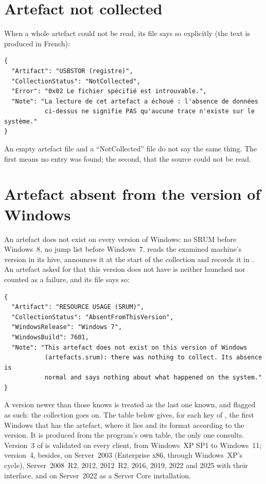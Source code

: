 \documentclass[11pt,a4paper,oneside]{report}
\begin{document}
\section{Artefact not collected}

When a whole artefact could not be read, its file says so explicitly (the text
is produced in French):

\begin{lstlisting}
{
  "Artifact": "USBSTOR (registre)",
  "CollectionStatus": "NotCollected",
  "Error": "0x02 Le fichier spécifié est introuvable.",
  "Note": "La lecture de cet artefact a échoué : l'absence de données
           ci-dessus ne signifie PAS qu'aucune trace n'existe sur le système."
}
\end{lstlisting}

\begin{attention}
An empty artefact file and a ``NotCollected'' file do not say the same thing.
The first means no entry was found; the second, that the source could not be
read.
\end{attention}

\section{Artefact absent from the version of Windows}\label{sec:versions}

An artefact does not exist on every version of Windows: no SRUM before
Windows~8, no jump list before Windows~7. \wac{} reads the examined machine's
version in its  hive, announces it at the start of the
collection and records it in . An artefact asked
for that this version does not have is neither launched nor counted as a
failure, and its file says so:

\begin{lstlisting}
{
  "Artifact": "RESOURCE USAGE (SRUM)",
  "CollectionStatus": "AbsentFromThisVersion",
  "WindowsRelease": "Windows 7",
  "WindowsBuild": 7601,
  "Note": "This artefact does not exist on this version of Windows
           (artefacts.srum): there was nothing to collect. Its absence is
           normal and says nothing about what happened on the system."
}
\end{lstlisting}

A version newer than those \wac{} knows is treated as the last one known, and
flagged as such: the collection goes on. The table below gives, for each key
of , the first Windows that has the artefact, where it lies and
its format according to the version. It is produced from the program's own
table, the only one \wac{} consults. Version~3 of \wac{} is validated on every client,
from Windows~XP SP1 to Windows~11; version~4, besides, on Server~2003
(Enterprise x86, through Windows~XP's cycle), Server~2008~R2, 2012, 2012~R2,
2016, 2019, 2022 and 2025 with their interface, and on Server~2022 as a Server
Core installation.
\end{document}
